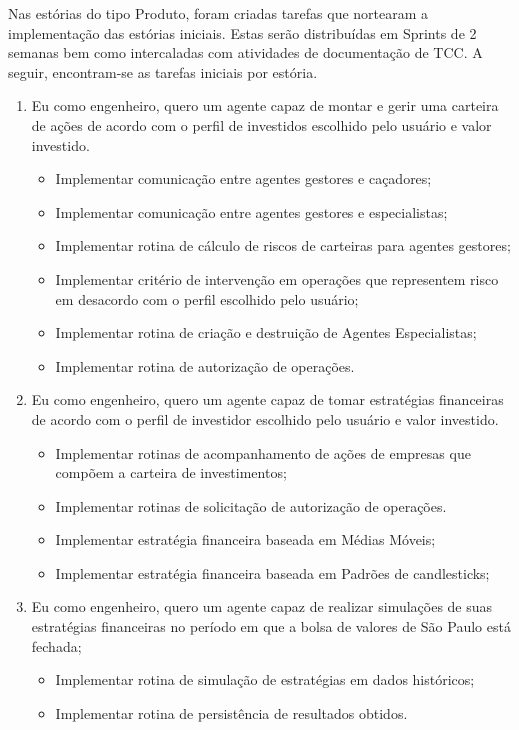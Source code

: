 Nas estórias do tipo Produto, foram criadas tarefas que nortearam a implementação das estórias iniciais. Estas serão distribuídas em Sprints de 2 semanas bem como intercaladas com atividades de documentação de TCC. A seguir, encontram-se as tarefas iniciais por estória.

\begin{enumerate}
\item Eu como engenheiro, quero um agente capaz de montar e gerir uma carteira de ações de acordo com o perfil de investidos escolhido pelo usuário e valor investido.
		\begin{itemize}
		\item Implementar comunicação entre agentes gestores e caçadores;
		\item Implementar comunicação entre agentes gestores e especialistas;
		\item Implementar rotina de cálculo de riscos de carteiras para agentes gestores;
		\item Implementar critério de intervenção em operações que representem risco em desacordo com o perfil escolhido pelo usuário;
		\item Implementar rotina de criação e destruição de Agentes Especialistas;
		\item Implementar rotina de autorização de operações.
		\end{itemize}
\item Eu como engenheiro, quero um agente capaz de tomar estratégias financeiras de acordo com o perfil de investidor escolhido pelo usuário e valor investido.
		\begin{itemize}
		\item Implementar rotinas de acompanhamento de ações de empresas que compõem a carteira de investimentos;
		\item Implementar rotinas de solicitação de autorização de operações.
		\item Implementar estratégia financeira baseada em Médias Móveis;
		\item Implementar estratégia financeira baseada em Padrões de candlesticks; 
		\end{itemize}
\item Eu como engenheiro, quero um agente capaz de realizar simulações de suas estratégias financeiras no período em que a bolsa de valores de São Paulo está fechada;
		\begin{itemize}
		\item Implementar rotina de simulação de estratégias em dados históricos;
		\item Implementar rotina de persistência de resultados obtidos.
		\end{itemize}


\end{enumerate}
